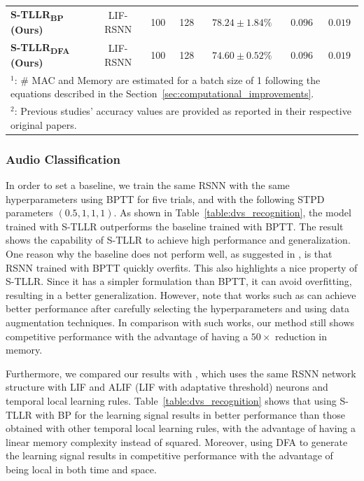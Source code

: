 \documentclass[10pt]{article} %
\begin{document}
\begin{table}[t]
{\begin{tabular}{lcccccc}
        \textbf{S-TLLR\textsubscript{BP} (Ours)} &LIF-RSNN  & 100 & 128 &$78.24\pm1.84\%$ & $0.096$ & $0.019$\\ %
        \textbf{S-TLLR\textsubscript{DFA} (Ours)} & LIF-RSNN  & 100 & 128 & $74.60\pm0.52\%$ & $0.096$ & $0.019$\\ %
        \hline
        \multicolumn{7}{l}{\small{$^1$: \# MAC and Memory are estimated for a batch size of 1 following the equations described in the Section~\ref{sec:computational_improvements}.}}\\
        \multicolumn{7}{l}{\small{$^2$: Previous studies' accuracy values are provided as reported in their respective original papers.}}
        \end{tabular}
        }
        \end{table}


        \subsubsection{Audio Classification}\label{sec:audio_classification}
        
        In order to set a baseline, we train the same RSNN with the same hyperparameters using BPTT for five trials, and with the following STPD parameters $(0.5, 1, 1, 1)$.
        As shown in Table~\ref{table:dvs_recognition}, the model trained with S-TLLR outperforms the baseline trained with BPTT.
        The result shows the capability of S-TLLR to achieve high performance and generalization.
        One reason why the baseline does not perform well, as suggested in \cite{Cramer2022TheNetworks}, is that RSNN trained with BPTT quickly overfits.
        This also highlights a nice property of S-TLLR. 
        Since it has a simpler formulation than BPTT, it can avoid overfitting, resulting in a better generalization.
        However, note that works such as \cite{Cramer2022TheNetworks, Bouanane2022ImpactRecognition} can achieve better performance after carefully selecting the hyperparameters and using data augmentation techniques.
        In comparison with such works, our method still shows competitive performance with the advantage of having a $50\times$ reduction in memory.
        
        Furthermore, we compared our results with \cite{Quintana2023ETLP:Hardware, Ortner2023OnlineProjection}, which uses the same RSNN network structure with LIF and ALIF (LIF with adaptative threshold) neurons and temporal local learning rules.
        Table~\ref{table:dvs_recognition} shows that using S-TLLR with BP for the learning signal results in better performance than those obtained with other temporal local learning rules, with the advantage of having a linear memory complexity instead of squared. 
        Moreover, using DFA to generate the learning signal results in competitive performance with the advantage of being local in both time and space.
        
\end{document}
